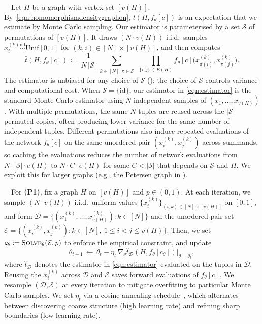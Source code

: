 \documentclass{article}
\theoremstyle{plain}
\theoremstyle{definition}
\theoremstyle{remark}
\begin{document}
\ $\,$
Let $H$ be a graph with vertex set $[v(H)]$. By~\eqref{eqn:homomorphismdensitygraphon}, $t(H, f_\theta[c])$ is an expectation that we estimate by Monte Carlo sampling. Our estimator is parameterised by a set $\mathcal{S}$ of permutations of $[v(H)]$. It draws $(N \cdot v(H))$ i.i.d.\ samples $x_i^{(k)} \stackrel{\mathrm{iid}}{\sim} \mathrm{Unif}[0,1]$ for $(k, i) \in [N] \times [v(H)]$, and then computes
\begin{equation}
\label{eqn:estimator}
  \widehat{t}(H, f_\theta[c])
  \,\coloneqq\,
  \frac{1}{N \, |\mathcal{S}|}
  \sum_{\substack{k \in [N], \pi \in \mathcal{S}}}\,
  \prod_{\{i, j\} \in E(H)}
  f_\theta[c]\bigl(x_{\pi(i)}^{(k)}, x_{\pi(j)}^{(k)}\bigr).
\end{equation}
The estimator is unbiased for any choice of $\mathcal{S}$ (); the choice of $\mathcal{S}$ controls variance and computational cost.
When $\mathcal{S} = \{\mathrm{id}\}$, our estimator in \eqref{eqn:estimator} is the standard Monte Carlo estimator using $N$ independent samples of $(x_1, \ldots, x_{v(H)})$. With multiple permutations, the same $N$ tuples are reused across the $|\mathcal{S}|$ permuted copies, often producing lower variance for the same number of independent tuples.
Different permutations also induce repeated evaluations of the network $f_\theta[c]$ on the same unordered pair $(x_i^{(k)}, x_j^{(k)})$ across summands, so caching the evaluations reduces the number of network evaluations from $N \cdot |\mathcal{S}| \cdot e(H)$ to $N \cdot C \cdot e(H)$ for some $C < |\mathcal{S}|$ that depends on $\mathcal{S}$ and $H$. We exploit this for larger graphs (e.g., the Petersen graph in ).

\ $\,$
For \textbf{(P1)}, fix a graph $H$ on $[v(H)]$ and $p \in (0, 1)$. At each iteration, we sample $(N \cdot v(H))$ i.i.d.\ uniform values $\{x_i^{(k)}\}_{(i,k) \in [N] \times [v(H)]}$ on $[0, 1]$, and form
$\mathcal{D} = \{(x_1^{(k)}, \ldots, x_{v(H)}^{(k)}) : k \in [N]\}$ and the unordered-pair set $\mathcal{E} = \{(x^{(k)}_i, x^{(k)}_j) : k \in [N],\ 1 \le i < j \le v(H)\}$. Then, we set $c_\theta \coloneqq \textsc{Solve}_\theta(\mathcal{E}, p)$ to enforce the empirical constraint, and update
\[
\theta_{t+1} \,\leftarrow\, \theta_t - \eta_t\, \nabla_\theta \widehat{t}_{\mathcal{D}}(H, f_\theta[c_\theta])\big|_{\theta = \theta_t},
\]
where $\widehat{t}_{\mathcal{D}}$ denotes the estimator in \eqref{eqn:estimator} evaluated on the tuples in $\mathcal{D}$. Reusing the $x_i^{(k)}$ across $\mathcal{D}$ and $\mathcal{E}$ saves forward evaluations of $f_\theta[c]$. We resample $(\mathcal{D}, \mathcal{E})$ at every iteration to mitigate overfitting to particular Monte Carlo samples.
We set $\eta_t$ via a cosine-annealing schedule~\citep{loshchilov2017sgdr}, which alternates between discovering coarse structure (high learning rate) and refining sharp boundaries (low learning rate). 
\end{document}
